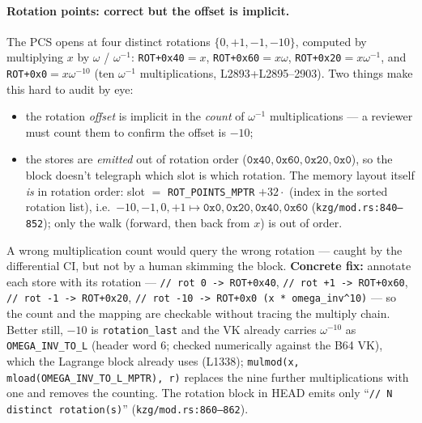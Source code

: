\paragraph{Rotation points: correct but the offset is implicit.}
The PCS opens at four distinct rotations $\{0, +1, -1, -10\}$, computed
by multiplying $x$ by $\omega$ / $\omega^{-1}$:
\texttt{ROT+0x40}$=x$, \texttt{ROT+0x60}$=x\omega$,
\texttt{ROT+0x20}$=x\omega^{-1}$, and
\texttt{ROT+0x0}$=x\omega^{-10}$ (ten $\omega^{-1}$
multiplications, L2893+L2895--2903). Two things make this hard
to audit by eye:
\begin{itemize}[leftmargin=1.4em,itemsep=2pt]
\item the rotation \emph{offset} is implicit in the \emph{count}
  of $\omega^{-1}$ multiplications --- a reviewer must count
  them to confirm the offset is $-10$;
\item the stores are \emph{emitted} out of rotation order
  ($\texttt{0x40},\texttt{0x60},\texttt{0x20},\texttt{0x0}$), so
  the block doesn't telegraph which slot is which rotation.
   The memory layout itself \emph{is} in
  rotation order: slot $=$ \texttt{ROT\_POINTS\_MPTR} $+ 32\cdot$
  (index in the sorted rotation list), i.e.\ $-10,-1,0,+1 \mapsto
  \texttt{0x0},\texttt{0x20},\texttt{0x40},\texttt{0x60}$
  (\texttt{kzg/\allowbreak{}mod.rs:840--852}); only the walk (forward, then
  back from $x$) is out of order.
\end{itemize}
A wrong multiplication count would query the wrong rotation ---
caught by the differential CI, but not by a human skimming the
block. \textbf{Concrete fix:} annotate each store with its
rotation --- \texttt{/\allowbreak{}/\allowbreak{} rot 0 -> ROT+0x40},
\texttt{/\allowbreak{}/\allowbreak{} rot +1 -> ROT+0x60},
\texttt{/\allowbreak{}/\allowbreak{} rot -1 -> ROT+0x20},
\texttt{/\allowbreak{}/\allowbreak{} rot -10 -> ROT+0x0 (x * omega\_\allowbreak{}inv\textasciicircum10)}
--- so the count and the mapping are checkable without tracing
the multiply chain. Better still, $-10$ is \texttt{rotation\_last}
and the VK already carries $\omega^{-10}$ as
\texttt{OMEGA\_INV\_TO\_L} (header word 6; checked numerically
against the B64 VK), which the Lagrange block already uses (L1338);
\texttt{mulmod(x, mload(OMEGA\_\allowbreak{}INV\_\allowbreak{}TO\_\allowbreak{}L\_\allowbreak{}MPTR), r)} replaces the
nine further multiplications with one and removes the counting.
 The rotation block in HEAD emits only
``\texttt{/\allowbreak{}/\allowbreak{} N distinct rotation(s)}'' (\texttt{kzg/\allowbreak{}mod.rs:860--862}).


